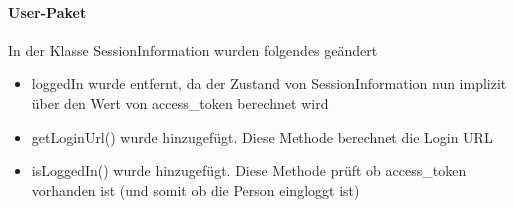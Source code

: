 \paragraph{User-Paket}
In der Klasse SessionInformation wurden folgendes geändert
\begin{itemize}
	\item loggedIn wurde entfernt, da der Zustand von SessionInformation nun implizit über den Wert von access\_token berechnet wird
	\item getLoginUrl() wurde hinzugefügt. Diese Methode berechnet die Login URL
	\item isLoggedIn() wurde hinzugefügt. Diese Methode prüft ob access\_token vorhanden ist (und somit ob die Person eingloggt ist)
\end{itemize}